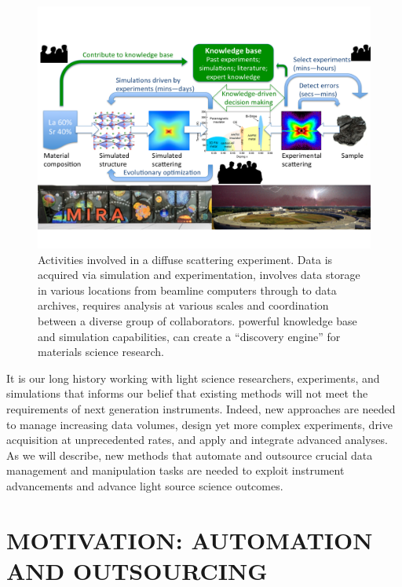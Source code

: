 \documentclass{aip-cp}
\begin{document}
\begin{figure}[h]
  \centerline{\includegraphics[width=6in,trim=0 2.6in 0 1.5in,clip]{Figs/diffuse.png}}
  \caption{Activities involved in a diffuse scattering experiment. Data is acquired
   via simulation and experimentation, involves data storage in various locations
from beamline computers through to data archives, requires analysis at various scales
and coordination between a diverse group of collaborators. 
powerful knowledge base and simulation capabilities, can create a ``discovery engine'' for materials 
science research. 
\label{fig:diffuse}}
\end{figure}

It is our long history working with light science researchers, experiments,
and simulations that informs our belief that existing methods 
will not meet the requirements of next generation instruments. Indeed, new approaches 
are needed to manage increasing data volumes, design yet more complex
experiments, drive acquisition at unprecedented rates, and apply
and integrate advanced analyses. As we will describe, 
new methods that automate and outsource crucial data management and
manipulation tasks are needed to exploit 
instrument advancements and advance light source science outcomes.



\section{MOTIVATION: AUTOMATION AND OUTSOURCING}
\end{document}
